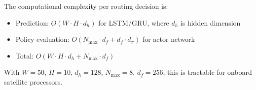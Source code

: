 The computational complexity per routing decision is:

\begin{itemize}
\item Prediction: $O(W \cdot H \cdot d_h)$ for LSTM/GRU, where $d_h$ is hidden dimension
\item Policy evaluation: $O(N_{\max} \cdot d_f + d_f \cdot d_\pi)$ for actor network
\item Total: $O(W \cdot H \cdot d_h + N_{\max} \cdot d_f)$
\end{itemize}

With $W=50$, $H=10$, $d_h=128$, $N_{\max}=8$, $d_f=256$, this is tractable for onboard satellite processors.

